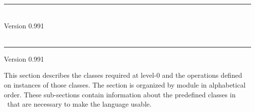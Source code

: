 \documentclass[twocolumn,wd,9pt]{isov2}
\newcommand{\version}{0.991}
\renewcommand{\extrahead}{Version \version}
\begin{document}
\begin{cover}
    \vspace*{\fill}
    \hrule
    \vspace{0.3cm}
    {\Huge \thestandard} \\
    \vspace{0.3cm}
    {\LARGE Version \version} \\
    \ISname \\
    \vspace{0.5cm}
    \hrule
    \clearpage
\end{cover}



\title{}{\thestandard}{\extrahead}






\newpage
\gdef\module{}\newpage

\gdef\module{level-0}\newpage
\gdef\module{level-0}\newpage
\gdef\module{level-0}\newpage
\gdef\module{level-0}\newpage

\label{section:level-0}
This section describes the classes required at level-0 and the operations
defined on instances of those classes.  The
section is organized by module in alphabetical order.  These sub-sections
contain information about the predefined classes in \eulisp\ that are necessary
to make the language usable.

\gdef\module{level-0}
\gdef\module{level-0}\newpage
\gdef\module{level-0}\newpage
\gdef\module{level-0}\newpage
\gdef\module{level-0}\newpage
\gdef\module{level-0}\newpage
\gdef\module{level-0}\newpage
\gdef\module{level-0}\newpage
\gdef\module{level-0}\newpage
\gdef\module{level-0}\newpage
\gdef\module{level-0}\newpage
\gdef\module{level-0}\newpage
\gdef\module{level-0}\newpage
\gdef\module{level-0}\newpage
\gdef\module{level-0}\newpage
\gdef\module{level-0}\newpage
\gdef\module{level-0}\newpage
\gdef\module{level-0}\newpage
\gdef\module{level-0}\newpage
\gdef\module{level-0}\newpage
\end{document}
